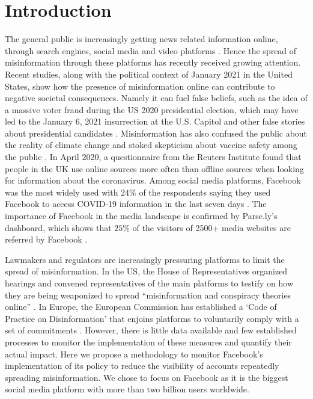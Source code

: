 \documentclass[review]{elsarticle}
\begin{document}
\linenumbers

\section{Introduction}

The general public is increasingly getting news related information online, through search engines, social media and video platforms \citep{mitchell2016modern}.
Hence the spread of misinformation through these platforms has recently received growing attention.
Recent studies, along with the political context of January 2021 in the United States, show how the presence of misinformation online can contribute to negative societal consequences.
Namely it can fuel false beliefs, such as the idea of a massive voter fraud during the US 2020 presidential election, which may have led to the January 6, 2021 insurrection at the U.S. Capitol \citep{benkler2020mail} and other false stories about presidential candidates \citep{allcott2017social}. 
Misinformation has also confused the public about the reality of climate change \citep{brulle30years, porter2019can} and stoked skepticism about vaccine safety among the public \citep{featherstone2020feeling, lahouati2020spread}. 
In April 2020, a questionnaire from the Reuters Institute found that people in the UK use online sources more often than offline sources when looking for information about the coronavirus. 
Among social media platforms, Facebook was the most widely used with $24\%$ of the respondents saying they used Facebook to access COVID-19 information in the last seven days \citep{fletcher2020information}.
The importance of Facebook in the media landscape is confirmed by Parse.ly’s dashboard, which shows that $25\%$ of the visitors of 2500+ media websites are referred by Facebook \citep{parslyDashboard}.

Lawmakers and regulators are increasingly pressuring platforms to limit the spread of misinformation. 
In the US, the House of Representatives organized hearings and convened representatives of the main platforms to testify on how they are being weaponized to spread ``misinformation and conspiracy theories online'' \citep{donovan2020}. 
In Europe, the European Commission has established a `Code of Practice on Disinformation' \citep{codePracticeMisinformation} that enjoins platforms to voluntarily comply with a set of commitments \citep{heldt2019let}. 
However, there is little data available and few established processes to monitor the implementation of these measures and quantify their actual impact. 
Here we propose a methodology to monitor Facebook’s implementation of its policy to reduce the visibility of accounts repeatedly spreading misinformation. 
We chose to focus on Facebook as it is the biggest social media platform with more than two billion users worldwide.
\end{document}
